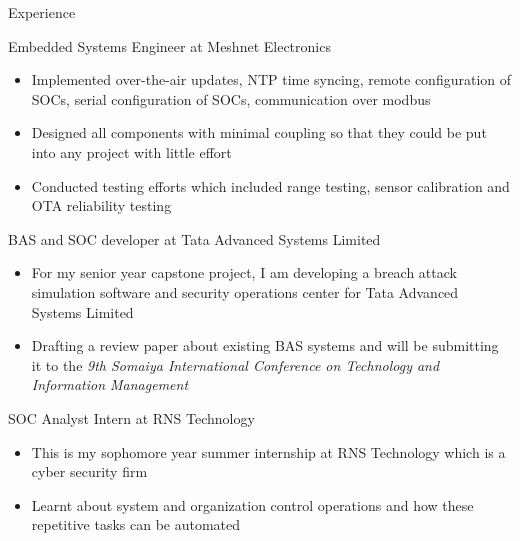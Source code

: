 \documentclass{article}
\newlength{\tabin}
\newlength{\secsep}
\newcommand{\lineunder}{\vspace*{-8pt} \\ \hspace*{-6pt} \hrulefill \\ \vspace*{-15pt}}
\newenvironment{tabbedsection}[1]{
	\begin{list}{}{
		\setlength{\itemsep}{0pt}
		\setlength{\labelsep}{0pt}
		\setlength{\labelwidth}{0pt}
		\setlength{\leftmargin}{\tabin}
		\setlength{\rightmargin}{\tabin}
		\setlength{\listparindent}{0pt}
		\setlength{\parsep}{0pt}
		\setlength{\parskip}{0pt}
		\setlength{\partopsep}{0pt}
		\setlength{\topsep}{#1}
	}
	\item[]
}{\end{list}}
\newenvironment{resume_section}[1]{
	\vspace{2\secsep}
	\textsc{\large#1}
	\lineunder
	\begin{tabbedsection}{\secsep}
}{\end{tabbedsection}}
\newenvironment{resume_subsection}[2][]{
	\textbf{#2} \hfill {\footnotesize #1} \hspace{2em}
	\begin{tabbedsection}{0.5\secsep}
}{\end{tabbedsection}}
\newenvironment{subitems}{
	\renewcommand{\labelitemi}{-}
	\begin{itemize}
		\setlength{\labelsep}{1em}
}{\end{itemize}}
\begin{document}
\begin{resume_section}{Experience}

	\begin{resume_subsection}{Embedded Systems Engineer at Meshnet Electronics}
		\begin{subitems}
			\item   Implemented over-the-air updates, NTP time
				syncing, remote configuration of SOCs, serial
				configuration of SOCs, communication over modbus
			\item   Designed all components with minimal coupling
				so that they could be put into any project with
				little effort
			\item   Conducted testing efforts which included range
				testing, sensor calibration and OTA reliability
				testing
		\end{subitems}
	\end{resume_subsection}

	\begin{resume_subsection}{BAS and SOC developer at Tata Advanced Systems Limited}
		\begin{subitems}
		\item For my senior year capstone project, I am developing a
			breach attack simulation software and security
			operations center for Tata Advanced Systems Limited
		\item Drafting a review paper about existing BAS systems and
			will be submitting it to the \textit{9th Somaiya
			International Conference on Technology and Information
			Management}
		\end{subitems}
	\end{resume_subsection}

	\begin{resume_subsection}{SOC Analyst Intern at RNS Technology}
		\begin{subitems}
		\item This is my sophomore year summer internship at RNS Technology
			which is a cyber security firm
		\item Learnt about system and organization control operations and
			how these repetitive tasks can be automated
		\end{subitems}
	\end{resume_subsection}

\end{resume_section}
\end{document}

